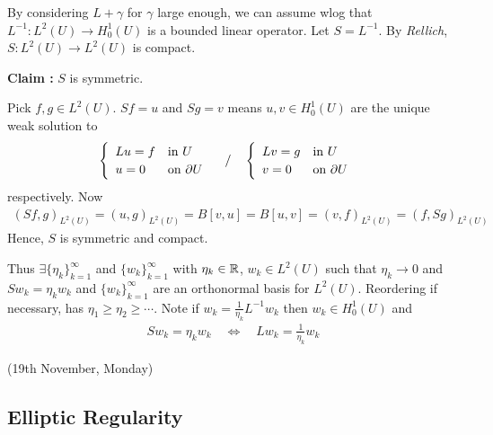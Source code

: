 \documentclass[12pt,a4paper]{report}
\newenvironment{proof}
{\begin{changemargin}{1cm}{0.5cm} 
	}%
	{\end{changemargin}
}
\newenvironment{subproof}
{\begin{changemargin}{0.5cm}{0.5cm} 
	}%
	{\end{changemargin}
}
\begin{document}
\begin{proof}
\pf By considering $L+\gamma$ for $\gamma$ large enough, we can assume wlog that $L^{-1} : L^2(U) \rightarrow H_0^1(U)$ is a bounded linear operator. Let $S = L^{-1}$. By \emph{Rellich}, $S: L^2(U) \rightarrow L^2(U)$ is compact.
\s

\textbf{Claim :} $S$ is symmetric.
\begin{subproof}
Pick $f,g \in L^2(U)$. $Sf = u$ and $Sg =v$ means $u,v\in H_0^1(U)$ are the unique weak solution to
\begin{align*}
\begin{cases}
\begin{array}{ll}
Lu = f & \text{in } U \\
u = 0 & \text{on } \partial U
\end{array}
\end{cases} / \quad \begin{cases}
\begin{array}{ll}
Lv = g & \text{in } U \\
v = 0 & \text{on } \partial U
\end{array}
\end{cases}
\end{align*}
respectively. Now 
\begin{align*}
(Sf, g)_{L^2(U)} =(u,g)_{L^2(U)} = B[v,u] = B[u,v] = (v,f)_{L^2(U)} = (f, Sg)_{L^2(U)}
\end{align*}
Hence, $S$ is symmetric and compact.
\end{subproof}
Thus $\exists \{ \eta_k \}_{k=1}^{\infty}$ and $\{w_k \}_{k=1}^{\infty}$ with $\eta_k \in \mathbb{R}$, $w_k \in L^2(U)$ such that $\eta_k \rightarrow 0$ and $Sw_{k} = \eta_k w_k$ and $\{w_k \}_{k=1}^{\infty}$ are an orthonormal basis for $L^2(U)$. Reordering if necessary, has $\eta_1 \geq \eta_2 \geq \cdots$. Note if $w_k = \frac{1}{\eta_k} L^{-1} w_k$ then $w_k \in H_0^1(U)$ and
\begin{align*}
S w_k = \eta_k w_k \quad \Leftrightarrow \quad Lw_k = \frac{1}{\eta_k} w_k 
\end{align*}

\eop
\end{proof}
\s

\newday

(19th November, Monday)

\subsection*{Elliptic Regularity}
\end{document}
